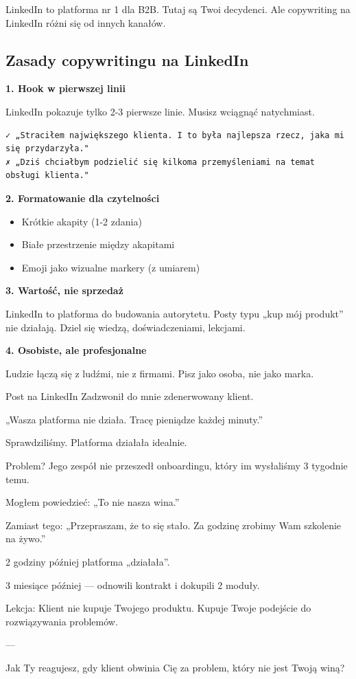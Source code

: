 \documentclass[
  12pt,
  a4paper,
  twoside,
  openright,
  12pt,
  DIV=12,
  BCOR=12mm]{scrbook}
\providecommand{\tightlist}{%
  \setlength{\itemsep}{0pt}\setlength{\parskip}{0pt}}\usepackage{longtable,booktabs,array}
\begin{document}
LinkedIn to platforma nr 1 dla B2B. Tutaj są Twoi decydenci. Ale
copywriting na LinkedIn różni się od innych kanałów.

\subsection{Zasady copywritingu na
LinkedIn}\label{zasady-copywritingu-na-linkedin}

\textbf{1. Hook w pierwszej linii}

LinkedIn pokazuje tylko 2-3 pierwsze linie. Musisz wciągnąć natychmiast.

\begin{verbatim}
✓ „Straciłem największego klienta. I to była najlepsza rzecz, jaka mi się przydarzyła."
✗ „Dziś chciałbym podzielić się kilkoma przemyśleniami na temat obsługi klienta."
\end{verbatim}

\textbf{2. Formatowanie dla czytelności}

\begin{itemize}
\tightlist
\item
  Krótkie akapity (1-2 zdania)
\item
  Białe przestrzenie między akapitami
\item
  Emoji jako wizualne markery (z umiarem)
\end{itemize}

\textbf{3. Wartość, nie sprzedaż}

LinkedIn to platforma do budowania autorytetu. Posty typu „kup mój
produkt'' nie działają. Dziel się wiedzą, doświadczeniami, lekcjami.

\textbf{4. Osobiste, ale profesjonalne}

Ludzie łączą się z ludźmi, nie z firmami. Pisz jako osoba, nie jako
marka.

\begin{przyklad}{Post na LinkedIn}
Zadzwonił do mnie zdenerwowany klient.

„Wasza platforma nie działa. Tracę pieniądze każdej minuty.”

Sprawdziliśmy. Platforma działała idealnie.

Problem? Jego zespół nie przeszedł onboardingu, który im wysłaliśmy 3 tygodnie temu.

Mogłem powiedzieć: „To nie nasza wina.”

Zamiast tego: „Przepraszam, że to się stało. Za godzinę zrobimy Wam szkolenie na żywo.”

2 godziny później platforma „działała”.

3 miesiące później --- odnowili kontrakt i dokupili 2 moduły.

Lekcja: Klient nie kupuje Twojego produktu. Kupuje Twoje podejście do rozwiązywania problemów.

---

Jak Ty reagujesz, gdy klient obwinia Cię za problem, który nie jest Twoją winą?
\end{przyklad}
\end{document}
